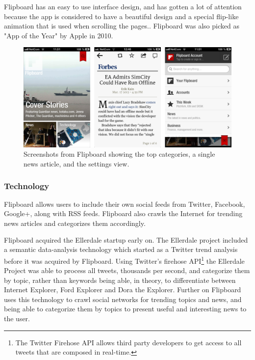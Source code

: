 Flipboard has an easy to use interface design, and has gotten a lot of attention because the app is considered to have a beautiful design\cite{flipboard_design} and a special flip-like animation that is used when scrolling the pages.\cite{flipboard_video}\cite{flipboard_animation}. Flipboard was also picked as "App of the Year" by Apple in 2010\cite{flipboard_app_of_the_year}.

\begin{figure}[!htbp]
\centering
\includegraphics[width=130mm]{GFX/screenshots/flipboard.png}
\caption{Screenshots from Flipboard showing the top categories, a single news article, and the settings view.}
\label{screenshots_flipboard}
\end{figure}

\subsubsection{Technology}
Flipboard allows users to include their own social feeds from Twitter, Facebook, Google+, along with RSS feeds. Flipboard also crawls the Internet for trending news articles and categorizes them accordingly.

Flipboard acquired the Ellerdale startup early on\cite{flipboard_acquired_ellerdale}. The Ellerdale project included a semantic data-analysis technology which started as a Twitter trend analysis before it was acquired by Flipboard. Using Twitter's firehose API\footnote{The Twitter Firehose API allows third party developers to get access to all tweets that are composed in real-time.} the Ellerdale Project was able to process all tweets, thousands per second, and categorize them by topic, rather than keywords\cite{flipboard_categorize_by_topic} being able, in theory, to differentiate between Internet Explorer, Ford Explorer and Dora the Explorer. Further on Flipboard uses this technology to crawl social networks for trending topics and news, and being able to categorize them by topics to present useful and interesting news to the user.

